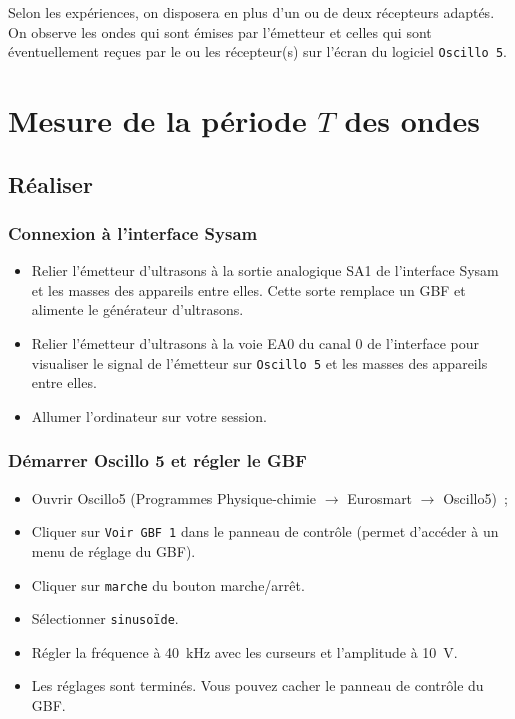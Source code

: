 \documentclass[a4paper, 11pt, final, garamond]{book}
\begin{document}
Selon les expériences, on disposera en plus d'un ou de deux récepteurs adaptés.
On observe les ondes qui sont émises par l'émetteur et celles qui sont
éventuellement reçues par le ou les récepteur(s) sur l'écran du logiciel
\texttt{Oscillo 5}.

\section{Mesure de la période $T$ des ondes}

\subsection{Réaliser}
\subsubsection{Connexion à l'interface Sysam}

\begin{itemize}
    \item Relier l'émetteur d'ultrasons à la sortie analogique SA1 de
        l'interface Sysam et les masses des appareils entre elles. Cette sorte
        remplace un GBF et alimente le générateur d'ultrasons.
    \item Relier l'émetteur d'ultrasons à la voie EA0 du canal 0 de
        l'interface pour visualiser le signal de l'émetteur sur \texttt{Oscillo
        5} et les masses des appareils entre elles.
    \item Allumer l'ordinateur sur votre session.
\end{itemize}

\subsubsection{Démarrer Oscillo 5 et régler le GBF}
\begin{itemize}
    \item Ouvrir Oscillo5 (Programmes Physique-chimie $\rightarrow$ Eurosmart
        $\rightarrow$ Oscillo5)~;
    \item Cliquer sur \texttt{Voir GBF 1} dans le panneau de contrôle (permet
        d'accéder à un menu de réglage du GBF).
    \item Cliquer sur \texttt{marche} du bouton marche/arrêt.
    \item Sélectionner \texttt{sinusoïde}.
    \item Régler la fréquence à \SI{40}{kHz} avec les curseurs et l'amplitude à
        \SI{10}{V}.
    \item Les réglages sont terminés. Vous pouvez cacher le panneau de contrôle
        du GBF.
\end{itemize}
\end{document}
